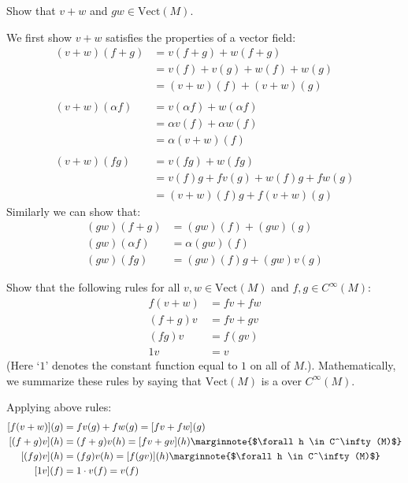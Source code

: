 \documentclass[10pt]{article}
\begin{document}
\begin{example}
	Show that $v+w$ and $gw \in \text{Vect}(M)$.
\end{example}
\sol We first show $v+w$ satisfies the properties of a vector field:
	$$
	\begin{aligned}
		(v+w)(f+g)&=v(f+g)+w(f+g)\\
		&=v(f)+v(g)+w(f)+w(g)\\
		&=(v+w)(f)+(v+w)(g)\\\\
		(v+w)(\alpha f)&=v(\alpha f)+w(\alpha f)\\
		&=\alpha v(f)+\alpha w(f)\\
		&=\alpha (v+w)(f)\\\\
		(v+w)(fg)&=v(fg)+w(fg)\\
		&=v(f)g+fv(g)+w(f)g+fw(g)\\
		&=(v+w)(f)g+f(v+w)(g)
	\end{aligned}
	$$
	Similarly we can show that:
	$$
	\begin{aligned}
		(gw)(f+g)&=(gw)(f)+(gw)(g)\\
		(gw)(\alpha f)&=\alpha (gw)(f)\\
		(gw)(fg)&=(gw)(f)g+(gw)v(g)
	\end{aligned}
	$$

\begin{example}\label{b1e8}
	Show that the following rules for all $v,w \in \text{Vect}(M)$ and
	$f, g \in C^\infty(M)$:
	$$
	\begin{aligned}
		f(v+w) &= fv + fw\\
		(f+g)v &= fv+gv\\
		(fg)v &= f(gv)\\
		1v &= v
	\end{aligned}
	$$
	(Here `$1$' denotes the constant function equal to $1$ on all of $M$.). 
	Mathematically, we summarize these rules by saying that $\text{Vect}(M)$ is 
	a  over $C^\infty(M)$.
\end{example}
\sol Applying above rules:
$$
\begin{aligned}
	[f(v+w)](g) &= fv(g) + fw(g) = [fv + fw](g)\\
	[(f+g)v](h) &= (f+g)v(h)=[fv+gv](h)\marginnote{$\forall h \in C^\infty(M)$}\\
	[(fg)v](h) &= (fg)v(h)=[f(gv)](h)\marginnote{$\forall h \in C^\infty(M)$}\\
	[1v](f) &= 1\cdot v(f)=v(f)
\end{aligned}
$$
\end{document}
